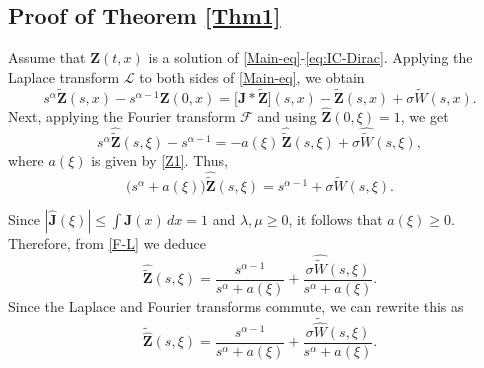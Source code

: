 \documentclass[12pt, reqno]{amsart}
\newcommand{\bz}{\ensuremath{\mathbf{Z}}}
\newcommand{\bj}{\ensuremath{\mathbf{J}}}
\begin{document}
\subsection{Proof of Theorem \ref{Thm1}}
Assume that $\bz(t, x)$ is a solution of \eqref{Main-eq}-\eqref{eq:IC-Dirac}.  
Applying the Laplace transform $\mathcal{L}$ to both sides of \eqref{Main-eq}, we obtain
\[
s^{\alpha} \tilde{\bz}(s, x) - s^{\alpha-1} \bz(0, x) 
= \bigl[\bj \ast \tilde{\bz}\bigr](s, x) - \tilde{\bz}(s, x) + \sigma \tilde{W}(s, x). 
\]
Next, applying the Fourier transform $\mathcal{F}$ and using $\hat{\bz}(0, \xi) = 1$, we get
\[
s^{\alpha} \hat{\tilde{\bz}}(s, \xi) - s^{\alpha-1} 
= -a(\xi)\,\hat{\tilde{\bz}}(s, \xi) + \sigma \hat{\tilde{W}}(s, \xi),
\]
where $a(\xi)$ is given by \eqref{Z1}.  
Thus,
\begin{equation}\label{F-L}
\bigl(s^{\alpha} + a(\xi)\bigr) \hat{\tilde{\bz}}(s, \xi) 
= s^{\alpha-1} + \sigma \hat{\tilde{W}}(s, \xi).
\end{equation}

Since $|\hat{\bj}(\xi)| \leq \int \bj(x)\,dx = 1$ and $\lambda, \mu\ge 0$, it follows that $a(\xi) \geq 0$.  
Therefore, from \eqref{F-L} we deduce
\begin{equation}\label{F-L1}
\hat{\tilde{\bz}}(s, \xi) 
= \frac{s^{\alpha-1}}{s^{\alpha} + a(\xi)} 
+ \frac{\sigma \hat{\tilde{W}}(s, \xi)}{s^{\alpha} + a(\xi)}.
\end{equation}
Since the Laplace and Fourier transforms commute, we can rewrite this as
\begin{equation}\label{F-L2}
\tilde{\hat{\bz}}(s, \xi) 
= \frac{s^{\alpha-1}}{s^{\alpha} + a(\xi)} 
+ \frac{\sigma \tilde{\hat{W}}(s, \xi)}{s^{\alpha} + a(\xi)}.
\end{equation}
\end{document}
